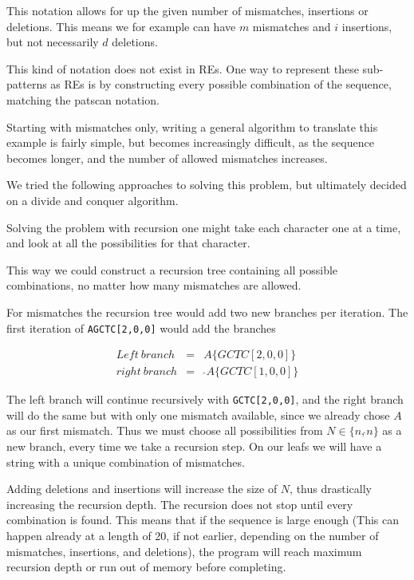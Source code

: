 \documentclass[12pt]{article}
\theoremstyle{definition}
\newcounter{subsubsubsection}[subsubsection]
\begin{document}
This notation allows for up the given number of mismatches, insertions or deletions. This means we for example can have $m$ mismatches and $i$ insertions, but not necessarily $d$ deletions.

This kind of notation does not exist in REs. One way to represent these sub-patterns as REs is by constructing every possible combination of the sequence, matching the patscan notation.

Starting with mismatches only, writing a general algorithm to translate this example is fairly simple, but becomes increasingly difficult, as the sequence becomes longer, and the number of allowed mismatches increases.

We tried the following approaches to solving this problem, but ultimately decided on a divide and conquer algorithm. 


Solving the problem with recursion one might take each character one at a time, and look at all the possibilities for that character.

This way we could construct a recursion tree containing all possible combinations, no matter how many mismatches are allowed.

For mismatches the recursion tree would add two new branches per iteration. The first iteration of \texttt{AGCTC[2,0,0]} would add the branches

\begin{eqnarray}
	Left\ branch &=& A\{GCTC[2,0,0]\} \\
	right\ branch &=&\ \hat{}A\{GCTC[1,0,0]\}
\end{eqnarray}

The left branch will continue recursively with \texttt{GCTC[2,0,0]}, and the right branch will do the same but with only one mismatch available, since we already chose $A$ as our first mismatch. Thus we must choose all possibilities from $N \in \{n, \hat{}n\}$ as a new branch, every time we take a recursion step.
On our leafs we will have a string with a unique combination of mismatches.

Adding deletions and insertions will increase the size of $N$, thus drastically increasing the recursion depth. The recursion does not stop until every combination is found. This means that if the sequence is large enough (This can happen already at a length of 20, if not earlier, depending on the number of mismatches, insertions, and deletions), the program will reach maximum recursion depth or run out of memory before completing.
\end{document}
